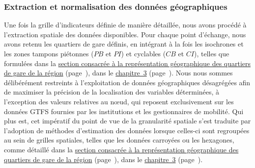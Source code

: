 \begin{refsegment}
\subsubsection*{Extraction et normalisation des données géographiques
    \label{chap6:methodologie-statistiques-normalisation}
    }

Une fois la grille d'indicateurs définie de manière détaillée, nous avons procédé à l'extraction spatiale des données disponibles. Pour chaque point d'échange, nous avons retenu les quartiers de gare définis, en intégrant à la fois les isochrones et les zones tampons piétonnes (\(PB\) et \(PI\)) et cyclables (\(CB\) et \(CI\)), telles que formulées dans la \hyperref[chap3:quartiers-gare-analyse-geostatistique]{section consacrée à la représentation géographique des quartiers de gare de la région} (page~\pageref{chap3:quartiers-gare-analyse-geostatistique}), dans le \hyperref[chap3:titre]{chapitre~3} (page~\pageref{chap3:titre}). Nous nous sommes délibérément restreints à l'exploitation de données géographiques désagrégées afin de maximiser la précision de la localisation des variables déterminées, à l'exception des valeurs relatives au nœud, qui reposent exclusivement sur les données \acrshort{GTFS} fournies par les institutions et les gestionnaires de mobilité. Qui plus est, cet impératif du point de vue de la granularité spatiale s'est traduite par l'adoption de méthodes d'estimation des données lorsque celles-ci sont regroupées au sein de grilles spatiales, telles que les données carroyées ou les hexagones, comme détaillé dans la \hyperref[chap3:quartiers-gare-analyse-geostatistique]{section consacrée à la représentation géographique des quartiers de gare de la région} (page~\pageref{chap3:quartiers-gare-analyse-geostatistique}), dans le \hyperref[chap3:titre]{chapitre~3} (page~\pageref{chap3:titre}).%


\end{refsegment}
